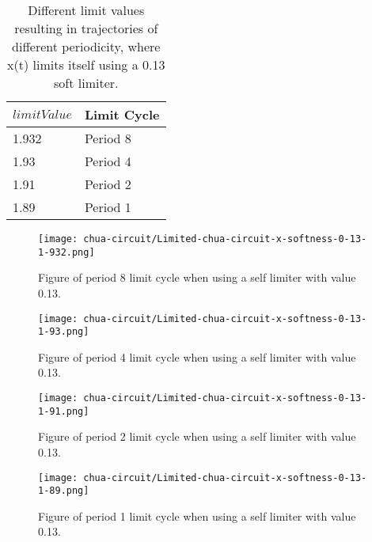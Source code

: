 \documentclass[main]{subfiles}
\begin{document}
\begin{table}[H]
\renewcommand{\arraystretch}{1.2}
\center
\begin{tabular}{@{}ll@{}}
	\toprule
   \(limitValue\) & Limit Cycle\\
   \midrule
   1.932 & Period 8 \\ 
   1.93 & Period 4 \\
   1.91  & Period 2 \\
   1.89 & Period 1 \\
   \bottomrule
\end{tabular}
\caption[Limiter values for periodic trajectories for for an x self-limiting limiter with softness 0.13]{Different limit values resulting in trajectories of different periodicity, where x(t) limits itself using a 0.13 soft limiter.}
\label{table:x-0.13-periodicities}
\end{table}

\begin{figure}[H]
\centering
\texttt{[image: chua-circuit/Limited-chua-circuit-x-softness-0-13-1-932.png]}
\caption[Figure of period 8 limit cycle using self limiting 0.13 soft limiter.]{Figure of period 8 limit cycle when using a self limiter with value 0.13.}
\label{figure:x-0.13-8-limit-cycle-trajectory}
\end{figure}

\begin{figure}[H]
\centering
\texttt{[image: chua-circuit/Limited-chua-circuit-x-softness-0-13-1-93.png]}
\caption[Figure of period 4 limit cycle using self limiter 0.13 soft limiter..]{Figure of period 4 limit cycle when using a self limiter with value 0.13.}
\label{figure:x-0.13-4-limit-cycle-trajectory}
\end{figure}

\begin{figure}[H]
\centering
\texttt{[image: chua-circuit/Limited-chua-circuit-x-softness-0-13-1-91.png]}
\caption[Figure of period 3 limit cycle using self limiter 0.13 soft limiter.]{Figure of period 2 limit cycle when using a self limiter with value 0.13.}
\label{figure:x-0.13-2-limit-cycle-trajectory}
\end{figure}

\begin{figure}[H]
\centering
\texttt{[image: chua-circuit/Limited-chua-circuit-x-softness-0-13-1-89.png]}
\caption[Figure of period 1 limit cycle using self limiter 0.13 soft limiter.]{Figure of period 1 limit cycle when using a self limiter with value 0.13.}
\label{figure:x-0.13-1-limit-cycle-trajectory}
\end{figure}
\end{document}
